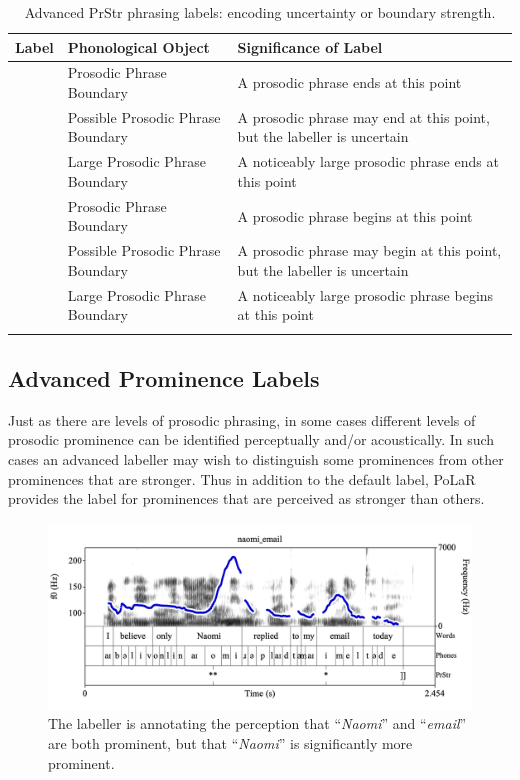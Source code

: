 \documentclass[11pt, twoside]{memoir}
\def\textlabel#1{{\relsize{-.5}\fontspec[Mapping=tex-text]{Roboto Mono}{#1}}}
\def\langtext#1{\textit{#1}}
\begin{document}
\begin{longtable}{clp{.5\linewidth}} \toprule \textbf{Label} & \textbf{Phonological Object} & \textbf{Significance of Label}\tabularnewline
\midrule \endhead
\rowcolor{green}
\textlabel{]} & Prosodic Phrase Boundary & A prosodic phrase ends at this point \tabularnewline
\textlabel{?]} & Possible Prosodic Phrase Boundary & A prosodic phrase may end at this point, but the labeller is uncertain \tabularnewline
\textlabel{]]} & Large Prosodic Phrase Boundary & A noticeably large prosodic phrase ends at this point \tabularnewline
\textlabel{[} & Prosodic Phrase Boundary & A prosodic phrase begins at this point \tabularnewline
\textlabel{?[} & Possible Prosodic Phrase Boundary & A prosodic phrase may begin at this point, but the labeller is uncertain \tabularnewline
\textlabel{[[} & Large Prosodic Phrase Boundary & A noticeably large prosodic phrase begins at this point \tabularnewline
%
\bottomrule
\caption{Advanced PrStr phrasing labels: encoding uncertainty or boundary strength.}
\end{longtable}

\subsection{Advanced Prominence Labels}\label{sec:advanced-prominence-labels}

Just as there are levels of prosodic phrasing, in some cases different levels of prosodic prominence can be identified perceptually and/or acoustically. In such cases an advanced labeller may wish to distinguish some prominences from other prominences that are stronger. Thus in addition to the default \textlabel{*} label, PoLaR provides the \textlabel{**} label for prominences that are perceived as stronger than others.

\begin{figure}[H]
\centering
%
\includegraphics[width=.875\linewidth]{PrStr-naomi_email-adv.png}
%
\caption{The labeller is annotating the perception that “\langtext{Naomi}” and “\langtext{email}” are both prominent, but that “\langtext{Naomi}” is significantly more prominent.%
\label{fig:naomi_email PrStr Adv}%
}
\end{figure}
\end{document}
